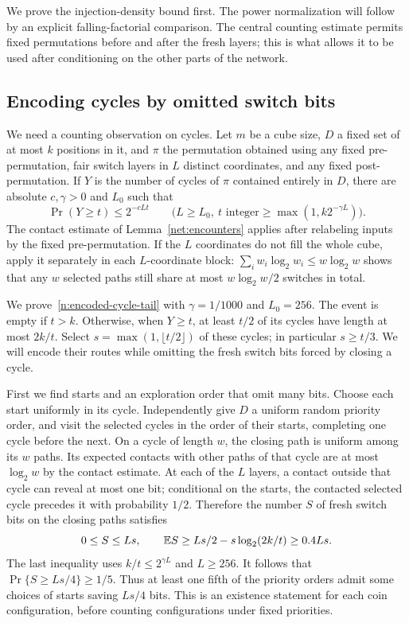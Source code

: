 We prove the injection-density bound first.  The power normalization
will follow by an explicit falling-factorial comparison.  The central
counting estimate permits fixed permutations before and after the
fresh layers; this is what allows it to be used after conditioning on
the other parts of the network.

\subsection{Encoding cycles by omitted switch bits}
\label{n:cycle-encoding}

We need a counting observation on cycles. Let \(m\) be a cube size, \(D\) a fixed set of at most \(k\) positions in it, and \(\pi\) the permutation obtained using any fixed pre-permutation, fair switch layers in \(L\) distinct coordinates, and any fixed post-permutation. If \(Y\) is the number of cycles of \(\pi\) contained entirely in \(D\), there are absolute \(c,\gamma>0\) and \(L_0\) such that
\begin{equation}
\Pr(Y\ge t)\le 2^{-c L t}
\qquad
\big(L\ge L_0,\ t\text{ integer}\ge\max(1,k2^{-\gamma L})\big).
\label{n:encoded-cycle-tail}
\end{equation}
The contact estimate of Lemma~\ref{net:encounters} applies after
relabeling inputs by the fixed pre-permutation.  If the $L$ coordinates
do not fill the whole cube, apply it separately in each $L$-coordinate
block: $\sum_iw_i\log_2w_i\le w\log_2w$ shows that any $w$ selected
paths still share at most $w\log_2w/2$ switches in total.

We prove~\eqref{n:encoded-cycle-tail} with $\gamma=1/1000$ and
$L_0=256$.  The event is empty if $t>k$.  Otherwise, when $Y\ge t$,
at least $t/2$ of its cycles have length at most $2k/t$.  Select
$s=\max(1,\lfloor t/2\rfloor)$ of these cycles; in particular
$s\ge t/3$.  We will encode their routes while omitting the fresh
switch bits forced by closing a cycle.

First we find starts and an exploration order that omit many bits.
Choose each start uniformly in its cycle.  Independently give $D$
a uniform random priority order, and visit the selected cycles in
the order of their starts, completing one cycle before the next.
On a cycle of length $w$, the closing path is uniform among its
$w$ paths.  Its expected contacts with other paths of that cycle
are at most $\log_2w$ by the contact estimate.  At each of the $L$
layers, a contact outside that cycle can reveal at most one bit;
conditional on the starts, the contacted selected cycle precedes
it with probability $1/2$.  Therefore the number $S$ of fresh
switch bits on the closing paths satisfies
\[
 0\le S\le Ls,\qquad
 \mathbb E S\ge Ls/2-s\log_2(2k/t)\ge0.4Ls.
\]
The last inequality uses $k/t\le2^{\gamma L}$ and $L\ge256$.
It follows that $\Pr\{S\ge Ls/4\}\ge1/5$.  Thus at least one
fifth of the priority orders admit some choices of starts saving
$Ls/4$ bits.  This is an existence statement for each coin
configuration, before counting configurations under fixed priorities.


